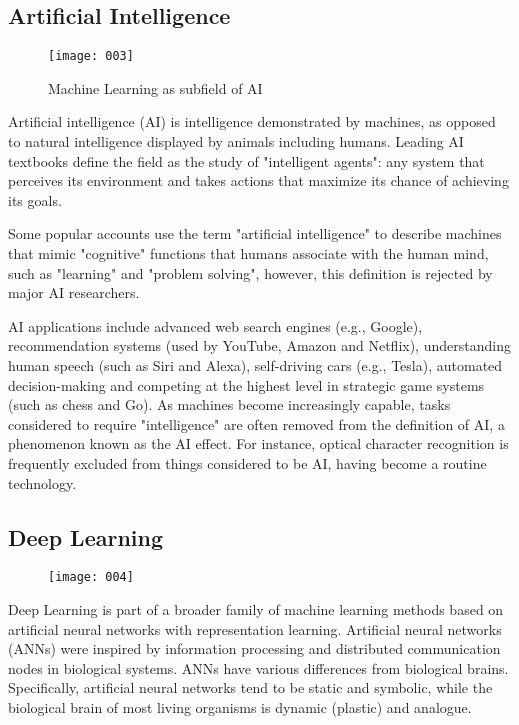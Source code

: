 \subsection{Artificial Intelligence}
\begin{wrapfigure}{r!}{0.35\textwidth}
    \texttt{[image: 003]}
    \caption{Machine Learning as subfield of AI}
  \label{fig:003}
\end{wrapfigure}
Artificial intelligence (AI) is intelligence demonstrated by machines, as opposed to natural intelligence displayed by animals including humans. Leading AI textbooks define the field as the study of "intelligent agents": any system that perceives its environment and takes actions that maximize its chance of achieving its goals.

Some popular accounts use the term "artificial intelligence" to describe machines that mimic "cognitive" functions that humans associate with the human mind, such as "learning" and "problem solving", however, this definition is rejected by major AI researchers.

AI applications include advanced web search engines (e.g., Google), recommendation systems (used by YouTube, Amazon and Netflix), understanding human speech (such as Siri and Alexa), self-driving cars (e.g., Tesla), automated decision-making and competing at the highest level in strategic game systems (such as chess and Go). As machines become increasingly capable, tasks considered to require "intelligence" are often removed from the definition of AI, a phenomenon known as the AI effect. For instance, optical character recognition is frequently excluded from things considered to be AI, having become a routine technology.

\subsection{Deep Learning}
\begin{wrapfigure}{l!}{0.35\textwidth}
  \begin{center}
    \texttt{[image: 004]}
  \end{center}
  \label{fig:004}
\end{wrapfigure}
Deep Learning is part of a broader family of machine learning methods based on artificial neural networks with representation learning. Artificial neural networks (ANNs) were inspired by information processing and distributed communication nodes in biological systems. ANNs have various differences from biological brains. Specifically, artificial neural networks tend to be static and symbolic, while the biological brain of most living organisms is dynamic (plastic) and analogue.

